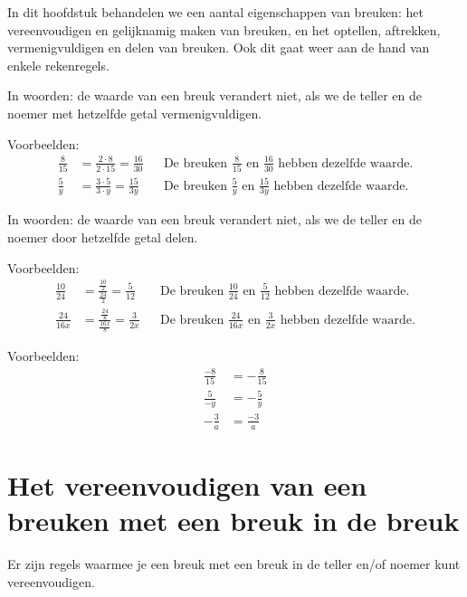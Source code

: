In dit hoofdstuk behandelen we een aantal eigenschappen van breuken: 
het vereenvoudigen en gelijknamig maken van breuken, en het optellen, 
aftrekken, vermenigvuldigen en delen van breuken. Ook dit gaat weer aan de hand van enkele rekenregels. 

{}

In woorden: de waarde van een breuk verandert niet, als we de teller en de noemer met hetzelfde getal vermenigvuldigen.

Voorbeelden:
\begin{align*}
\frac{8}{15}    &= \frac{2 \cdot 8}{2 \cdot 15} = \frac{16}{30} & &\text{De breuken } \frac{8}{15} \text{ en } \frac{16}{30} \text{ hebben dezelfde waarde.} \\[1em]
\frac{5}{y}     &= \frac{3 \cdot 5}{3 \cdot y} = \frac{15}{3y} & &\text{De breuken } \frac{5}{y} \text{ en } \frac{15}{3y} \text{ hebben dezelfde waarde.}
\end{align*}


In woorden: de waarde van een breuk verandert niet, als we de teller en de noemer door hetzelfde getal delen.

Voorbeelden:
\begin{align*}
\frac{10}{24} &= \frac{\frac{10}{2}}{\frac{24}{2}} = \frac{5}{12} & &\text{De breuken } \frac{10}{24} \text{ en } \frac{5}{12} \text{ hebben dezelfde waarde.} \\[1em]
\frac{24}{16x} &= \frac{\frac{24}{8}}{\frac{16x}{8}} = \frac{3}{2x} & &\text{De breuken } \frac{24}{16x} \text{ en } \frac{3}{2x} \text{ hebben dezelfde waarde.}
\end{align*}


Voorbeelden:
\begin{align*}
\frac{-8}{15} &= -\frac{8}{15} \\[1em]
\frac{5}{-y}  &= -\frac{5}{y}  \\[1em]
-\frac{3}{a}  &= \frac{-3}{a}
\end{align*}

\section{Het vereenvoudigen van een breuken met een breuk in de breuk}
Er zijn regels waarmee je een breuk met een breuk in de teller en/of noemer kunt vereenvoudigen.


